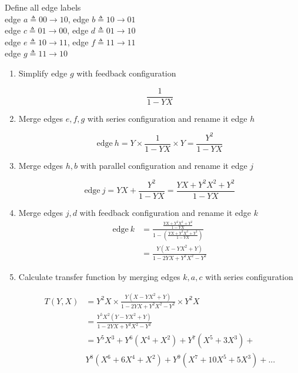 \begin{example} Define all edge labels\\
\label{ex3}
 edge $ a\triangleq 0 0 \rightarrow 1 0$,  edge $b \triangleq 1 0 \rightarrow 0 1$\\
 edge $ c \triangleq 0 1 \rightarrow 0 0$, edge $d \triangleq 0 1 \rightarrow 1 0$\\
 edge $ e \triangleq 1 0 \rightarrow 1 1$, edge $f \triangleq 1 1 \rightarrow 1 1$\\
 edge $ g \triangleq 1 1 \rightarrow 1 0$

\begin{enumerate}
\item Simplify edge $g$ with feedback configuration

$$ \frac{1}{1-YX}$$

\item Merge edges $e,f,g$ with series configuration and rename it edge $h$

$$\text{edge}~h = Y\times \frac{1}{1-YX}\times Y=\frac{Y^2}{1-YX}$$

\item Merge edges $h,b$ with parallel configuration and rename it edge $j$

$$\text{edge}~j = YX+ \frac{Y^2}{1-YX}= \frac{YX+Y^2X^2+Y^2}{1-YX}$$

\item Merge  edges $j,d$ with feedback configuration and rename it edge $k$ 
\begin{equation*}
\begin{split}
 \text{edge}~k&= \frac{\frac{YX+Y^2X^2+Y^2}{1-YX}}{1-(\frac{YX+Y^2X^2+Y^2}{1-YX})}\\
 &=\frac{Y(X-YX^2+Y)}{1-2YX+Y^2X^2-Y^2}
\end{split}
\end{equation*}

\item Calculate transfer function by merging edges $k,a,c$ with series configuration

\begin{equation*}
\begin{split}
T(Y,X)&=Y^2X \times \frac{Y(X-YX^2+Y)}{1-2YX+Y^2X^2-Y^2}\times Y^2X \\
&=\frac{Y^5X^2(Y-YX^2+Y)}{1-2YX+Y^2X^2-Y^2}\\
&=Y^5X^3+Y^6(X^4+X^2)+Y^7(X^5+3X^3)+\\
&Y^8(X^6+6X^4+X^2)+Y^9(X^7+10X^5+5X^3)+...
\end{split}
\end{equation*}
\end{enumerate}
\end{example}

